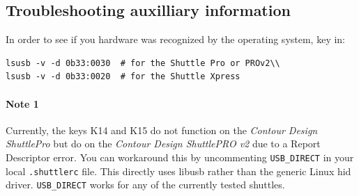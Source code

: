 \subsection{Troubleshooting auxilliary information}%
\label{sub:troubleshooting_auxilliary_information}

In order to see if you hardware was recognized by the operating
system, key in:

\begin{lstlisting}[style=sh]
lsusb -v -d 0b33:0030  # for the Shuttle Pro or PROv2\\
lsusb -v -d 0b33:0020  # for the Shuttle Xpress
\end{lstlisting}

\paragraph{Note 1} Currently, the keys K14 and K15 do not function
on the \textit{Contour Design ShuttlePro} but do on the
\textit{Contour Design ShuttlePRO v2} due to a Report Descriptor
error.  You can workaround this by uncommenting \texttt{USB\_DIRECT}
in your local \texttt{.shuttlerc} file.  This directly uses libusb
rather than the generic Linux hid driver.  \texttt{USB\_DIRECT}
works for any of the currently tested shuttles.

